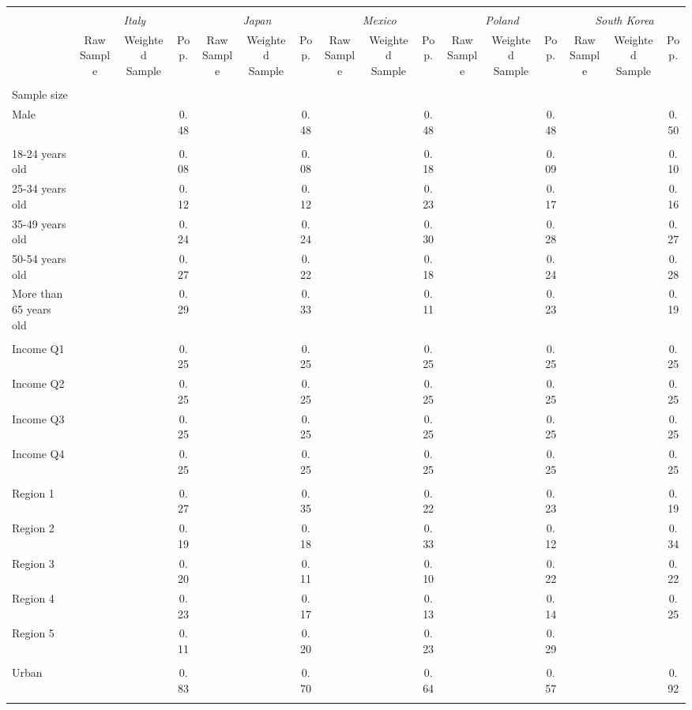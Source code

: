 \begin{tabular}{l*{15}{c}}
\toprule
\hline \\[-1.8ex]
\multicolumn{1}{c}{\em{ }} & \multicolumn{3}{c}{\em{Italy}} & \multicolumn{3}{c}{\em{Japan}} & \multicolumn{3}{c}{\em{Mexico}} & \multicolumn{3}{c}{\em{Poland}} & \multicolumn{3}{c}{\em{South Korea}} \\
\cmidrule(l{3pt}r{3pt}){2-4} \cmidrule(l{3pt}r{3pt}){5-7} \cmidrule(l{3pt}r{3pt}){8-10} \cmidrule(l{3pt}r{3pt}){11-13} \cmidrule(l{3pt}r{3pt}){14-16}
\noalign{\smallskip}  & Raw Sample & Weighted Sample & Pop. & Raw Sample & Weighted Sample & Pop. & Raw Sample & Weighted Sample & Pop. & Raw Sample & Weighted Sample & Pop. & Raw Sample & Weighted Sample & Pop. \\
\hline \\[-1.8ex] 
Sample size & & & & & & & & & &  & & & &  & \\
\noalign{\smallskip}\hline \noalign{\smallskip}Male & & & 0.48 & & & 0.48 & & & 0.48 & & & 0.48 & & & 0.50 \\ 
\\
18-24 years old & & & 0.08 & & & 0.08 & & & 0.18 & & & 0.09 & & & 0.10 \\
25-34 years old & & & 0.12 & & & 0.12 & & & 0.23 & & & 0.17 & & & 0.16 \\
35-49 years old & & & 0.24 & & & 0.24 & & & 0.30 & & & 0.28 & & & 0.27 \\
50-54 years old & & & 0.27 & & & 0.22 & & & 0.18 & & & 0.24 & & & 0.28 \\
More than 65 years old & & & 0.29 & & & 0.33 & & & 0.11 & & & 0.23 & & & 0.19 \\ 
\\
Income Q1 & & & 0.25 & & & 0.25 & & & 0.25 & & & 0.25 & & & 0.25 \\
Income Q2 & & & 0.25 & & & 0.25 & & & 0.25 & & & 0.25 & & & 0.25 \\
Income Q3 & & & 0.25 & & & 0.25 & & & 0.25 & & & 0.25 & & & 0.25 \\
Income Q4 & & & 0.25 & & & 0.25 & & & 0.25 & & & 0.25 & & & 0.25 \\
\\
Region 1 & & & 0.27 & & & 0.35 & & & 0.22 & & & 0.23 & & & 0.19 \\
Region 2 & & & 0.19 & & & 0.18 & & & 0.33 & & & 0.12 & & & 0.34 \\
Region 3 & & & 0.20 & & & 0.11 & & & 0.10 & & & 0.22 & & & 0.22 \\
Region 4 & & & 0.23 & & & 0.17 & & & 0.13 & & & 0.14 & & & 0.25 \\
Region 5 & & & 0.11 & & & 0.20 & & & 0.23 & & & 0.29 & & & \\
\\
Urban & & & 0.83 & & & 0.70 & & & 0.64 & & & 0.57 & & & 0.92 \\
\\
\bottomrule
\end{tabular}